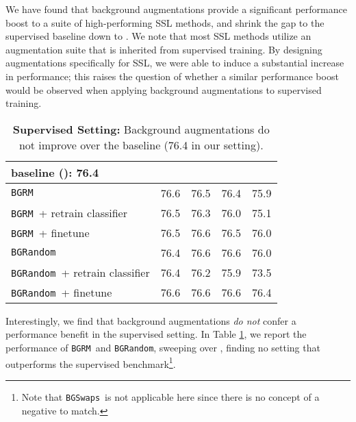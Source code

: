 \documentclass[twoside,11pt]{article}
\newcommand{\bgrm}{\texttt{BG\textunderscore RM}}
\newcommand{\bgswaps}{\texttt{BG\textunderscore Swaps}}
\newcommand{\bgrand}{\texttt{BG\textunderscore Random}}
\begin{document}
We have found that background augmentations provide a significant performance boost to a suite of high-performing SSL methods, and shrink the gap to the supervised baseline down to . We note that most SSL methods utilize an augmentation suite that is inherited from supervised training. By designing augmentations specifically for SSL, we were able to induce a substantial increase in performance; this raises the question of whether a similar performance boost would be observed when applying background augmentations to supervised training.



\begin{table}
    \centering
    \begin{tabular}{l|cccc}\toprule
        baseline (): 76.4 &  &  &  & \\\midrule
        \rowcolor{lightgray}
        \bgrm & 76.6 & 76.5 & 76.4 & 75.9 \\
        \bgrm~+ \small{retrain classifier} & 76.5 & 76.3 & 76.0 & 75.1 \\ 
        \bgrm~+ \small{finetune}  & 76.5 & 76.6 & 76.5 & 76.0 \\ \midrule
        \rowcolor{lightgray}
        \bgrand & 76.4 & 76.6 & 76.6 & 76.0 \\ 
        \bgrand~+ \small{retrain classifier}  & 76.4 & 76.2 & 75.9 & 73.5 \\
        \bgrand~+ \small{finetune}  & 76.6 & 76.6 & 76.6 & 76.4 \\ \bottomrule
    \end{tabular}
    \caption{\textbf{Supervised Setting:} Background augmentations do not improve over the baseline (76.4 in our setting).}
    \label{tab:supervised}
\end{table}


Interestingly, we find that background augmentations \emph{do not} confer a performance benefit in the supervised setting. In Table \ref{tab:supervised}, we report the performance of \bgrm~and \bgrand, sweeping over , finding no setting that outperforms the supervised benchmark\footnote{Note that \bgswaps~is not applicable here since there is no concept of a negative to match.}.  
\end{document}
